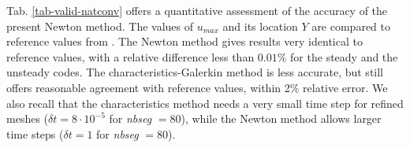 Tab. \ref{tab-valid-natconv} offers a quantitative assessment of the accuracy of the present Newton method. 
The values of $u_{max}$  and its location $Y$ are compared to reference values from \cite{LeQuere91}. 
The Newton method gives results very identical to reference values, with a relative difference less than $0.01 \%$ for the steady and the unsteady codes. 
The characteristics-Galerkin method is less accurate, but still offers reasonable agreement with reference values, within 2$\%$ relative error. 
We also recall that the characteristics method needs a very small time step for refined meshes ($\delta t = 8\cdot 10^{-5}$ for {\em nbseg} $= 80$), while the Newton method allows larger time steps ($\delta t = 1$ for {\em nbseg} $= 80$). %

